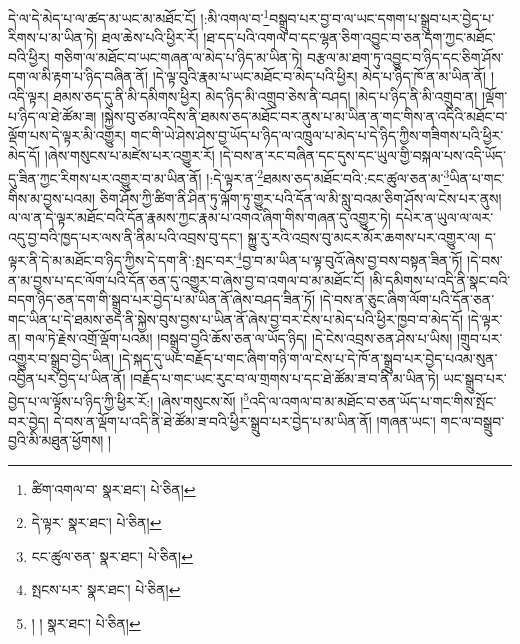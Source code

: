 དེ་ལ་དེ་མེད་པ་ལ་ཚད་མ་ཡང་མ་མཐོང་ངོ། །:མི་འགལ་བ་\footnote{ཚིག་འགལ་བ་  སྣར་ཐང་།  པེ་ཅིན། }བསྒྲུབ་པར་བྱ་བ་ལ་ཡང་དགག་པ་སྒྲུབ་པར་བྱེད་པ་རིགས་པ་མ་ཡིན་ཏེ། ཐལ་ཆེས་པའི་ཕྱིར་རོ། །ཐ་དད་པའི་འགལ་བ་དང་ལྷན་ཅིག་འབྱུང་བ་ཅན་དག་ཀྱང་མཐོང་བའི་ཕྱིར། གཅིག་ལ་མཐོང་བ་ཡང་གཞན་ལ་མེད་པ་ཉིད་མ་ཡིན་ཏེ། བརྩལ་མ་ཐག་ཏུ་འབྱུང་བ་ཉིད་དང་ཅིག་ཤོས་དག་ལ་མི་རྟག་པ་ཉིད་བཞིན་ནོ། །དེ་ལྟ་བུའི་རྣམ་པ་ཡང་མཐོང་བ་མེད་པའི་ཕྱིར། མེད་པ་ཉིད་ཁོ་ན་མ་ཡིན་ནོ། །འདི་ལྟར། ཐམས་ཅད་དུ་ནི་མི་དམིགས་ཕྱིར། མེད་ཉིད་མི་འགྲུབ་ཅེས་ནི་བཤད། །མེད་པ་ཉིད་ནི་མི་འགྲུབ་ན། །ལྡོག་པ་ཉིད་ལ་ཐེ་ཚོམ་ཟ། །སྐྱེས་བུ་ཙམ་འདིས་ནི་ཐམས་ཅད་མཐོང་བར་ནུས་པ་མ་ཡིན་ན་གང་གིས་ན་འདིའི་མཐོང་བ་ལྡོག་པས་དེ་ལྟར་མི་འགྱུར། གང་གི་ཡེ་ཤེས་ཤེས་བྱ་ཡོད་པ་ཉིད་ལ་འཁྲུལ་པ་མེད་པ་དེ་ཉིད་ཀྱིས་གཟིགས་པའི་ཕྱིར་མེད་དོ། །ཞེས་གསུངས་པ་མཛེས་པར་འགྱུར་རོ། །དེ་བས་ན་རང་བཞིན་དང་དུས་དང་ཡུལ་གྱི་བསྐལ་པས་འདི་ཡོད་དུ་ཟིན་ཀྱང་རིགས་པར་འགྱུར་བ་མ་ཡིན་ནོ། །:དེ་ལྟར་ན་\footnote{དེ་ལྟར་  སྣར་ཐང་།  པེ་ཅིན། }ཐམས་ཅད་མཐོང་བའི་:ངང་ཚུལ་ཅན་མ་\footnote{ངང་ཚུལ་ཅན་  སྣར་ཐང་།  པེ་ཅིན། }ཡིན་པ་གང་གིས་མ་བྱས་པའམ། ཅིག་ཤོས་ཀྱི་ཚིག་ནི་ཤིན་ཏུ་ལྐོག་ཏུ་གྱུར་པའི་དོན་ལ་མི་སླུ་བའམ་ཅིག་ཤོས་ལ་ངེས་པར་ནུས། ལ་ལ་ན་དེ་ལྟར་མཐོང་བའི་དོན་རྣམས་ཀྱང་རྣམ་པ་འགའ་ཞིག་གིས་གཞན་དུ་འགྱུར་ཏེ། དཔེར་ན་ཡུལ་ལ་ལར་འདུ་བྱ་བའི་ཁྱད་པར་ལས་ནི་ནིམ་པའི་འབྲས་བུ་དང་། སྐྱུ་རུ་རའི་འབྲས་བུ་མངར་མོར་ཆགས་པར་འགྱུར་ལ། ད་ལྟར་ནི་དེ་མ་མཐོང་བ་ཉིད་ཀྱིས་དེ་དག་ནི་:སྤང་བར་\footnote{སྤངས་པར་  སྣར་ཐང་།  པེ་ཅིན། }བྱ་བ་མ་ཡིན་པ་ལྟ་བུའོ་ཞེས་བྱ་བས་བསྟན་ཟིན་ཏོ། །དེ་བས་ན་མ་བྱས་པ་དང་ལོག་པའི་དོན་ཅན་དུ་འགྱུར་བ་ཞེས་བྱ་བ་འགལ་བ་མ་མཐོང་ངོ། །མི་དམིགས་པ་འདི་ནི་སྣང་བའི་བདག་ཉིད་ཅན་དག་གི་སྒྲུབ་པར་བྱེད་པ་མ་ཡིན་ནོ་ཞེས་བཤད་ཟིན་ཏོ། །དེ་བས་ན་ཅུང་ཞིག་ལོག་པའི་དོན་ཅན་གང་ཡིན་པ་དེ་ཐམས་ཅད་ནི་སྐྱེས་བུས་བྱས་པ་ཡིན་ནོ་ཞེས་བྱ་བར་ངེས་པ་མེད་པའི་ཕྱིར་ཁྱབ་བ་མེད་དོ། །དེ་ལྟར་ན། གལ་ཏེ་རྗེས་འགྲོ་ལྡོག་པའམ། །བསྒྲུབ་བྱའི་ཆོས་ཅན་ལ་ཡོད་ཉིད། །དེ་ངེས་འབྲས་ཅན་ཤེས་པ་ཡིས། །གྲུབ་པར་འགྱུར་བ་སྒྲུབ་བྱེད་ཡིན། །དེ་སྐད་དུ་ཡང་བརྗོད་པ་གང་ཞིག་གཉི་ག་ལ་ངེས་པ་དེ་ཁོ་ན་སྒྲུབ་པར་བྱེད་པའམ་སུན་འབྱིན་པར་བྱེད་པ་ཡིན་ནོ། །བརྗོད་པ་གང་ཡང་རུང་བ་ལ་གྲགས་པ་དང་ཐེ་ཚོམ་ཟ་བ་ནི་མ་ཡིན་ཏེ། ཡང་སྒྲུབ་པར་བྱེད་པ་ལ་ལྟོས་པ་ཉིད་ཀྱི་ཕྱིར་རོ:། །ཞེས་གསུངས་སོ། །\footnote{། །  སྣར་ཐང་།  པེ་ཅིན། }འདི་ལ་འགལ་བ་མ་མཐོང་བ་ཅན་ཡོད་པ་གང་གིས་སྤོང་བར་བྱེད། དེ་བས་ན་ལྡོག་པ་འདི་ནི་ཐེ་ཚོམ་ཟ་བའི་ཕྱིར་སྒྲུབ་པར་བྱེད་པ་མ་ཡིན་ནོ། །གཞན་ཡང་། གང་ལ་བསྒྲུབ་བྱའི་མི་མཐུན་ཕྱོགས། །
